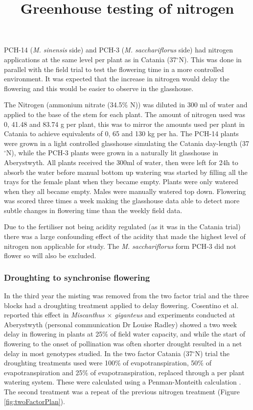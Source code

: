\documentclass[fleqn, 15pt, lineno]{olplainarticle}
\begin{document}
 


\title{Greenhouse testing of nitrogen}

PCH-14 (\textit{M. sinensis} side) and PCH-3 (\textit{M. sacchariflorus} side) had nitrogen applications at the same level per plant as in Catania (37$^{\circ}$N).
This was done in parallel with the field trial to test the flowering time in a more controlled environment.
It was expected that the increase in nitrogen would delay the flowering and this would be easier to observe in the glasshouse.

The Nitrogen (ammonium nitrate (34.5\% N)) was diluted in 300 ml of water and applied to the base of the stem for each plant.
The amount of nitrogen used was 0, 41.48 and 83.74 g per plant, this was to mirror the amounts used per plant in Catania to achieve equivalents of 0, 65 and 130 kg per ha.
The PCH-14 plants were grown in a light controlled glasshouse simulating the Catania day-length (37$^{\circ}$N), while the PCH-3 plants were grown in a naturally lit glasshouse in Aberystwyth.
All plants received the 300ml of water, then were left for 24h to absorb the water before manual bottom up watering was started by filling all the trays for the female plant when they became empty.
Plants were only watered when they all became empty.
Males were manually watered top down.
Flowering was scored three times a week making the glasshouse data able to detect more subtle changes in flowering time than the weekly field data.

Due to the fertiliser not being acidity regulated (as it was in the Catania trial) there was a large confounding effect of the acidity that made the highest level of nitrogen non applicable for study.
The \textit{M. sacchariflorus} form PCH-3 did not flower so will also be excluded.




\FloatBarrier
\subsubsection{Droughting to synchronise flowering}

In the third year the misting was removed from the two factor trial and the three blocks had a droughting treatment applied to delay flowering.
Cosentino et al. \citep{Cosentino2007} reported this effect in \textit{Miscanthus $\times$ giganteus} and experiments conducted at Aberystwyth (personal communication Dr Louise Radley) showed a two week delay in flowering in plants at 25\% of field water capacity, and while the start of flowering to the onset of pollination was often shorter drought resulted in a net delay in most genotypes studied.
In the two factor Catania (37$^{\circ}$N) trial the droughting treatments used were 100\% of evapotranspiration, 50\% of evapotranspiration and 25\% of evapotranspiration, replaced through a per plant watering system.
These were calculated using a Penman-Monteith calculation \citep{Monteith1965}.
The second treatment was a repeat of the previous nitrogen treatment (Figure \ref{fig:twoFactorPlan}).
\end{document}
